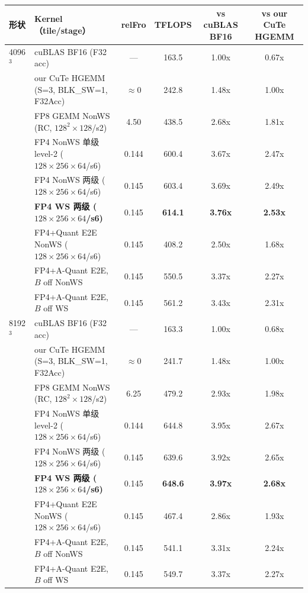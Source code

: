 \begin{center}
\scriptsize
\begin{tabular}{llcccc}
\toprule
形状 & Kernel（tile/stage） & relFro & TFLOPS & vs cuBLAS BF16 & vs our CuTe HGEMM \\
\midrule
4096$^3$ & cuBLAS BF16 (F32 acc)              & ---   & 163.5 & 1.00x & 0.67x \\
         & our CuTe HGEMM (S=3, BLK\_SW=1, F32Acc) & $\approx$0 & 242.8 & 1.48x & 1.00x \\
         & FP8 GEMM NonWS (RC, $128^2{\times}128$/s2) & 4.50 & 438.5 & 2.68x & 1.81x \\
         & FP4 NonWS 单级 level-2 ($128{\times}256{\times}64$/s6) & 0.144 & 600.4 & 3.67x & 2.47x \\
         & FP4 NonWS 两级 ($128{\times}256{\times}64$/s6) & 0.145 & 603.4 & 3.69x & 2.49x \\
         & \textbf{FP4 WS 两级 ($128{\times}256{\times}64$/s6)} & 0.145 & \textbf{614.1} & \textbf{3.76x} & \textbf{2.53x} \\
         & FP4+Quant E2E NonWS ($128{\times}256{\times}64$/s6) & 0.145 & 408.2 & 2.50x & 1.68x \\
         & FP4+A-Quant E2E, $B$ off NonWS & 0.145 & 550.5 & 3.37x & 2.27x \\
         & FP4+A-Quant E2E, $B$ off WS    & 0.145 & 561.2 & 3.43x & 2.31x \\
\midrule
8192$^3$ & cuBLAS BF16 (F32 acc)              & ---   & 163.3 & 1.00x & 0.68x \\
         & our CuTe HGEMM (S=3, BLK\_SW=1, F32Acc) & $\approx$0 & 241.7 & 1.48x & 1.00x \\
         & FP8 GEMM NonWS (RC, $128^2{\times}128$/s2) & 6.25 & 479.2 & 2.93x & 1.98x \\
         & FP4 NonWS 单级 level-2 ($128{\times}256{\times}64$/s6) & 0.144 & 644.8 & 3.95x & 2.67x \\
         & FP4 NonWS 两级 ($128{\times}256{\times}64$/s6) & 0.145 & 639.6 & 3.92x & 2.65x \\
         & \textbf{FP4 WS 两级 ($128{\times}256{\times}64$/s6)} & 0.145 & \textbf{648.6} & \textbf{3.97x} & \textbf{2.68x} \\
         & FP4+Quant E2E NonWS ($128{\times}256{\times}64$/s6) & 0.145 & 467.4 & 2.86x & 1.93x \\
         & FP4+A-Quant E2E, $B$ off NonWS & 0.145 & 541.1 & 3.31x & 2.24x \\
         & FP4+A-Quant E2E, $B$ off WS    & 0.145 & 549.7 & 3.37x & 2.27x \\
\bottomrule
\end{tabular}
\end{center}

